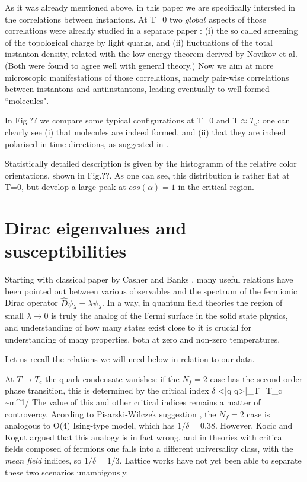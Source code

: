     As it was already mentioned above, in this paper we are specifically
intersted in the correlations between instantons. At T=0 two
 $global$ aspects  of those correlations
were already studied in a
separate paper \cite{SV_94}: (i)
the so called screening of the topological charge by light quarks, and (ii)
fluctuations of the total instanton density, related with the low energy
theorem derived by Novikov et al. (Both were found to agree well
with general theory.) Now we aim at more microscopic
manifestations of those correlations, namely pair-wise correlations between
instantons and antiinstantons, leading eventually to well formed ``molecules".

In Fig.?? we compare some typical
configurations at T=0 and T$\approx T_c$:
one can clearly see (i) that molecules are indeed formed, and (ii) that they
are indeed polarised in time directions, as suggested in \cite{}.

Statistically detailed description is given by the histogramm of the relative
color orientations, shown in Fig.??. As one can see, this distribution is
rather flat at T=0, but develop a large peak at $cos(\alpha)=1$
in the critical region.

\section{Dirac eigenvalues and susceptibilities}

   Starting with classical paper by Casher and Banks \cite{BC_80},
many useful relations have been pointed out
between various observables and the spectrum of the fermionic Dirac operator
$\hat D \psi_\lambda=\lambda \psi_\lambda$. In a way,
in quantum field theories the region of small
$\lambda \rightarrow 0$ is truly the analog of the Fermi surface in the solid
state physics, and understanding of how many states exist close to it
is crucial for understanding of many properties, both at zero and non-zero
temperatures.

  Let us recall  the relations we will need below in relation to our
data.


   At $T\rightarrow T_c$ the quark condensate vanishes: if the $N_f=2$ case
has the second order phase transition, this is determined by the critical
index $\delta$
\be
<\bar q q>|_{T=T_c} \sim m^{1/\delta}
\ee
The value of this and other critical indices remains a matter of controvercy.
Acording to Pisarski-Wilczek suggestion
\cite{PW_84}, the $N_f=2$ case is analogous
to O(4) Ising-type model, which has $1/\delta=0.38$. However, Kocic and Kogut
\cite{KK_95} argued that this analogy is in fact wrong, and in theories with
critical fields composed of fermions one falls into a different universality
class, with the {\it mean field} indices, so $1/\delta=1/3$. Lattice works
have not yet been able to separate these two scenarios unambigously.

